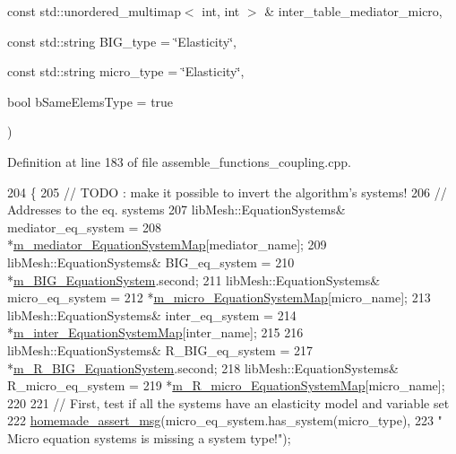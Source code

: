 {\begin{DoxyParamCaption}
\item[{const std\+::unordered\+\_\+multimap$<$ int, int $>$ \&}]{inter\+\_\+table\+\_\+mediator\+\_\+micro, }
\item[{const std\+::string}]{B\+I\+G\+\_\+type = {\ttfamily \char`\"{}Elasticity\char`\"{}}, }
\item[{const std\+::string}]{micro\+\_\+type = {\ttfamily \char`\"{}Elasticity\char`\"{}}, }
\item[{bool}]{b\+Same\+Elems\+Type = {\ttfamily true}}
\end{DoxyParamCaption}
)}\label{classcarl_1_1assemble__coupling__matrices_ac8e2ab74817605feb97044d794fc04c9}


Definition at line 183 of file assemble\+\_\+functions\+\_\+coupling.\+cpp.


\begin{DoxyCode}
204     \{
205         \textcolor{comment}{// TODO : make it possible to invert the algorithm's systems!}
206         \textcolor{comment}{// Addresses to the eq. systems}
207         libMesh::EquationSystems& mediator\_eq\_system =
208                 *\hyperlink{classcarl_1_1assemble__coupling__matrices_a9d61d2378c5658d6cfc7fa0d2ef306a5}{m\_mediator\_EquationSystemMap}[mediator\_name];
209         libMesh::EquationSystems& BIG\_eq\_system =
210                 *\hyperlink{classcarl_1_1assemble__coupling__matrices_a74638b62015299b30afb23168b141429}{m\_BIG\_EquationSystem}.second;
211         libMesh::EquationSystems& micro\_eq\_system =
212                 *\hyperlink{classcarl_1_1assemble__coupling__matrices_a13fddbcb853df9b7ce1a99062fb9f8b6}{m\_micro\_EquationSystemMap}[micro\_name];
213         libMesh::EquationSystems& inter\_eq\_system =
214                 *\hyperlink{classcarl_1_1assemble__coupling__matrices_a6c9fab72397ed371acccbf88fd72665f}{m\_inter\_EquationSystemMap}[inter\_name];
215 
216         libMesh::EquationSystems& R\_BIG\_eq\_system =
217                 *\hyperlink{classcarl_1_1assemble__coupling__matrices_ac8e2172182aa563e854e7b693344b301}{m\_R\_BIG\_EquationSystem}.second;
218         libMesh::EquationSystems& R\_micro\_eq\_system =
219                 *\hyperlink{classcarl_1_1assemble__coupling__matrices_a5b7c4f9307a9611926dc1ccf8bb33d4b}{m\_R\_micro\_EquationSystemMap}[micro\_name];
220 
221         \textcolor{comment}{// First, test if all the systems have an elasticity model and variable set}
222         \hyperlink{common__header_8h_a593ccc80b790b2268653fcf6597bf451}{homemade\_assert\_msg}(micro\_eq\_system.has\_system(micro\_type),
223                 \textcolor{stringliteral}{" Micro equation systems is missing a system type!"});

\end{DoxyCode}
